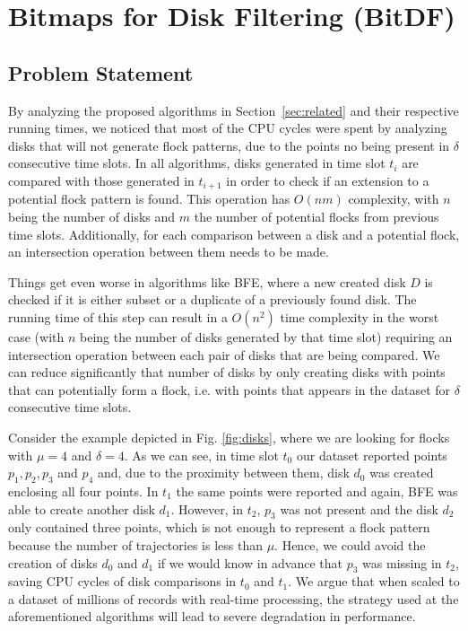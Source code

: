 \chapter{\textbf{Bit}maps for \textbf{D}isk \textbf{F}iltering (BitDF)}
\label{chp:algorithm}
\section{Problem Statement}
By analyzing the proposed algorithms in Section~\ref{sec:related} and their respective running times, we noticed that
most of the CPU cycles were spent by analyzing disks that will not generate flock patterns, due to the points no being
present in $\delta$ consecutive time slots. In all algorithms, disks generated in time slot $t_i$ are compared with
those generated in $t_{i+1}$ in order to check if an extension to a potential flock pattern is found. This operation has
$O(nm)$ complexity, with $n$ being the number of disks and $m$ the number of potential flocks from previous time slots.
Additionally, for each comparison between a disk and a potential flock, an intersection operation between them needs to
be made.

Things get even worse in algorithms like BFE, where a new created disk $D$ is checked if it is either subset or a
duplicate of a previously found disk. The running time of this step can result in a $O(n^2)$ time complexity in the
worst case (with $n$ being the number of disks generated by that time slot) requiring an intersection operation between
each pair of disks that are being compared. We can reduce significantly that number of disks by only creating disks with
points that can potentially form a flock, i.e. with points that appears in the dataset for $\delta$ consecutive time
slots.

Consider the example depicted in Fig. \ref{fig:disks}, where we are looking for flocks with $\mu=4$ and $\delta=4$. As
we can see, in time slot $t_0$ our dataset reported points $p_1,p_2,p_3$ and $p_4$ and, due to the proximity between
them, disk $d_0$ was created enclosing all four points. In $t_1$ the same points were reported and again, BFE was able
to create another disk $d_1$. However, in $t_2$, $p_3$ was not present and the disk $d_2$ only contained three points,
which is not enough to represent a flock pattern because the number of trajectories is less than $\mu$. Hence, we could
avoid the creation of disks $d_0$ and $d_1$ if we would know in advance that $p_3$ was missing in $t_2$, saving CPU
cycles of disk comparisons in $t_0$ and $t_1$. We argue that when scaled to a dataset of millions of records with
real-time processing, the strategy used at the aforementioned algorithms will lead to severe degradation in performance.

